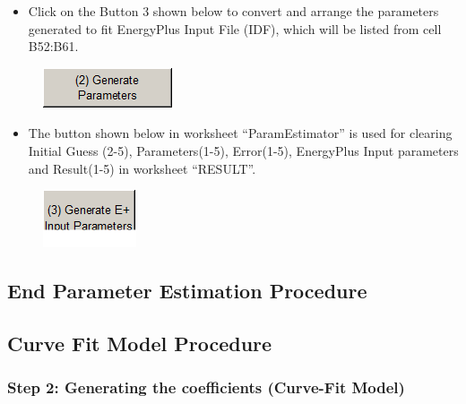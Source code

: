\begin{itemize}
\tightlist
\item
  Click on the Button 3 shown below to convert and arrange the parameters generated to fit EnergyPlus Input File (IDF), which will be listed from cell B52:B61.
\end{itemize}

\begin{figure}[htbp]
\centering
\includegraphics{media/image050.png}
\caption{}
\end{figure}

\begin{itemize}
\tightlist
\item
  The button shown below in worksheet ``ParamEstimator'' is used for clearing Initial Guess (2-5), Parameters(1-5), Error(1-5), EnergyPlus Input parameters and Result(1-5) in worksheet ``RESULT''.
\end{itemize}

\begin{figure}[htbp]
\centering
\includegraphics{media/image051.png}
\caption{}
\end{figure}

\subsection{End Parameter Estimation Procedure}\label{end-parameter-estimation-procedure-000}

\subsection{Curve Fit Model Procedure}\label{curve-fit-model-procedure-000}

\subsubsection{Step 2: Generating the coefficients (Curve-Fit Model)}\label{step-2-generating-the-coefficients-curve-fit-model-000}

